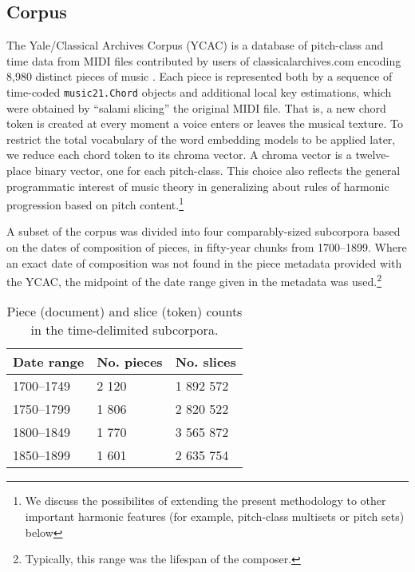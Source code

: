 
\subsection{Corpus}\label{corpus}

The Yale/Classical Archives Corpus (YCAC) is a database of pitch-class
and time data from MIDI files contributed by users of
classicalarchives.com encoding 8,980 distinct pieces of music
\cite{white2014yale}. Each piece is represented both by a sequence of
time-coded \texttt{music21.Chord} objects and additional local key estimations, which were obtained by ``salami slicing'' the original MIDI file. That is, a new chord token is created at every moment a voice enters or leaves the musical texture. To restrict the total vocabulary of the word embedding models to be applied later, we reduce each chord token to its chroma vector. A chroma vector is a twelve-place binary vector, one for each pitch-class. This choice also reflects the general programmatic interest of music theory in generalizing about rules of harmonic progression based on pitch content.\footnote{We discuss the possibilites of extending the present methodology to other important harmonic features (for example, pitch-class multisets or pitch sets) below}

A subset of the corpus was divided into four comparably-sized subcorpora based on the dates of composition of pieces, in fifty-year chunks from 1700--1899. Where an exact date of composition was not found in the piece metadata provided with the YCAC, the midpoint of the date range given in the metadata was used.\footnote{Typically, this range was the lifespan of the composer.}

\begin{table}
 \begin{center}
 \begin{tabular}{|l|l|l|}
  \hline
  Date range & No. pieces  & No. slices  \\
\hline
\hline
1700--1749 & 2 120 & 1 892 572 \\
\hline
1750--1799 & 1 806 & 2 820 522 \\
\hline
1800--1849 & 1 770 & 3 565 872 \\
\hline
1850--1899 & 1 601 & 2 635 754 \\
\hline

 \end{tabular}
\end{center}
 \caption{Piece (document) and slice (token) counts in the time-delimited subcorpora.}
 \label{tab:counts}
\end{table}

